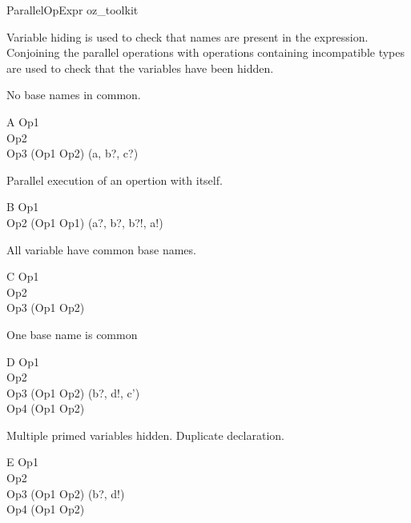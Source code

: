 \begin{zsection}
  \SECTION ParallelOpExpr \parents oz\_toolkit
\end{zsection}

Variable hiding is used to check that names are present in the
expression. Conjoining the parallel operations with operations
containing incompatible types are used to check that the variables
have been hidden.

No base names in common. 
\begin{class}{A}
  Op1 \\
  Op2 \\
  Op3 \sdef (Op1 \parallel Op2) \hide (a, b?, c?)
\end{class}

Parallel execution of an opertion with itself.
\begin{class}{B}
  Op1 \\
  Op2 \sdef (Op1 \parallel Op1) \hide (a?, b?, b?!, a!)
\end{class}

All variable have common base names.
\begin{class}{C}
  Op1 \\
  Op2 \\
  Op3 \sdef (Op1 \parallel Op2) 
\end{class}

One base name is common
\begin{class}{D}
  Op1 \\
  Op2 \\
  Op3 \sdef (Op1 \parallel Op2) \hide (b?, d!, c')\\
  Op4 \sdef (Op1 \parallel Op2) 
\end{class}

Multiple primed variables hidden.
Duplicate declaration.
\begin{class}{E}
  Op1 \\
  Op2 \\
  Op3 \sdef (Op1 \parallel Op2) \hide (b?, d!)\\
  Op4 \sdef (Op1 \parallel Op2) 
\end{class}
